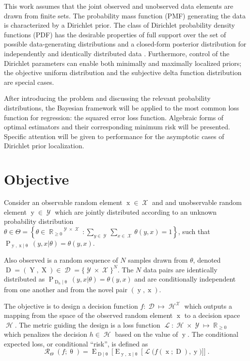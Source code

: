 \documentclass{article}
\DeclareMathOperator{\xrm}{\mathrm{x}}
\DeclareMathOperator{\Xrm}{\mathrm{X}}
\DeclareMathOperator{\yrm}{\mathrm{y}}
\DeclareMathOperator{\Yrm}{\mathrm{Y}}
\DeclareMathOperator{\Drm}{\mathrm{D}}
\DeclareMathOperator{\Prm}{\mathrm{P}}
\DeclareMathOperator{\Erm}{\mathrm{E}}
\DeclareMathOperator{\Xcal}{\mathcal{X}}
\DeclareMathOperator{\Ycal}{\mathcal{Y}}
\DeclareMathOperator{\Dcal}{\mathcal{D}}
\DeclareMathOperator{\Hcal}{\mathcal{H}}
\DeclareMathOperator{\Rcal}{\mathcal{R}}
\DeclareMathOperator{\Lcal}{\mathcal{L}}
\DeclareMathOperator{\Rbb}{\mathbb{R}}
\begin{document}
This work assumes that the joint observed and unobserved data elements are drawn from finite sets. The probability mass function (PMF) generating the data is characterized by a Dirichlet prior. The class of Dirichlet probability density functions (PDF) has the desirable properties of full support over the set of possible data-generating distributions and a closed-form posterior distribution for independently and identically distributed data \cite{ferguson}. Furthermore, control of the Dirichlet parameters can enable both minimally and maximally localized priors; the objective uniform distribution and the subjective delta function distribution are special cases. 

After introducing the problem and discussing the relevant probability distributions, the Bayesian framework will be applied to the most common loss function for regression: the squared error loss function. Algebraic forms of optimal estimators and their corresponding minimum risk will be presented. Specific attention will be given to performance for the asymptotic cases of Dirichlet prior localization.











\section{Objective}

Consider an observable random element $\xrm \in \Xcal$ and and unobservable random element $\yrm \in \Ycal$ which are jointly distributed according to an unknown probability distribution $\theta \in \Theta = \left\{ \theta \in {\Rbb_{\geq 0}}^{\Ycal \times \Xcal}: \sum_{y \in \Ycal} \sum_{x \in \Xcal} \theta(y,x) = 1 \right\}$, such that $\Prm_{\yrm,\xrm | \uptheta}(y,x | \theta) = \theta(y,x)$. 

Also observed is a random sequence of $N$ samples drawn from $\theta$, denoted $\Drm = ( \Yrm,\Xrm ) \in \Dcal = \{\Ycal \times \Xcal\}^N$. The $N$ data pairs are identically distributed as $\Prm_{\Drm_n | \uptheta}(y,x | \theta) = \theta(y,x)$ and are conditionally independent from one another and from the novel pair $(\yrm,\xrm)$.

The objective is to design a decision function $f: \Dcal \mapsto \Hcal^{\Xcal}$ which outputs a mapping from the space of the observed random element $\xrm$ to a decision space $\Hcal$. The metric guiding the design is a loss function $\Lcal: \Hcal \times \Ycal \mapsto \Rbb_{\geq 0}$ which penalizes the decision $h \in \Hcal$ based on the value of $\yrm$. The conditional expected loss, or conditional ``risk'', is defined as
\begin{equation} \label{eq:risk_cond}
\Rcal_{\Theta}(f ; \uptheta) = \Erm_{\Drm | \uptheta} \bigg[ \Erm_{\yrm,\xrm | \uptheta} \Big[ \Lcal\big( f(\xrm;\Drm),\yrm \big) \Big] \bigg] \;.
\end{equation}
\end{document}
